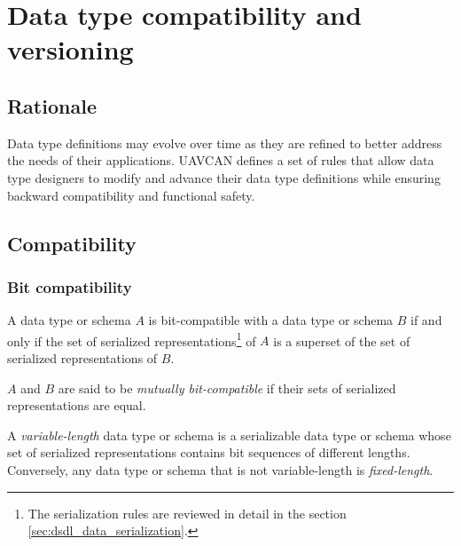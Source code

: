 \section{Data type compatibility and versioning}\label{sec:dsdl_versioning}

\subsection{Rationale}

Data type definitions may evolve over time as they are refined to better address the needs of their applications.
UAVCAN defines a set of rules that allow data type designers to modify and advance their
data type definitions while ensuring backward compatibility and functional safety.

\subsection{Compatibility}

\subsubsection{Bit compatibility}

A data type or schema $A$ is bit-compatible with a data type or schema $B$ if and only if
the set of serialized representations\footnote{The serialization rules are reviewed
in detail in the section \ref{sec:dsdl_data_serialization}.}
of $A$ is a superset of the set of serialized representations of $B$.

$A$ and $B$ are said to be \emph{mutually bit-compatible} if
their sets of serialized representations are equal.

A \emph{variable-length} data type or schema is a serializable data type or schema
whose set of serialized representations contains bit sequences of different lengths.
Conversely, any data type or schema that is not variable-length is \emph{fixed-length}.

